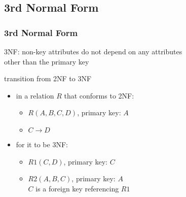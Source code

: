 \documentclass[dvipsnames]{beamer}
\begin{document}
\subsection{3rd Normal Form}

\begin{frame}
  \frametitle{3rd Normal Form}

  \begin{definition}
    \alert{3NF}: non-key attributes do not depend on any attributes\\
      other than the primary key
  \end{definition}

  \pause
  \begin{block}{transition from 2NF to 3NF}
    \begin{itemize}
      \item in a relation $R$ that conforms to 2NF:
      \begin{itemize}
        \item $R(A,B,C,D)$, primary key: $A$
        \item $C \rightarrow D$
      \end{itemize}

      \pause
      \item for it to be 3NF:
      \begin{itemize}
        \item $R1(C,D)$, primary key: $C$
        \item $R2(A,B,C)$, primary key: $A$\\
          $C$ is a foreign key referencing $R1$
      \end{itemize}
    \end{itemize}
 \end{block}
\end{frame}
\end{document}
